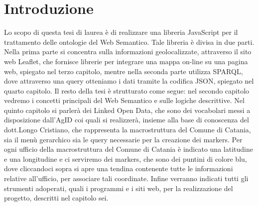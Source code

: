\documentclass[a4paper,11pt]{article}
\begin{document}
\tableofcontents
\newpage

\section{Introduzione}
Lo scopo di questa tesi di laurea è di realizzare una libreria JavaScript per il trattamento delle ontologie del Web Semantico.
Tale libreria è divisa in due parti. Nella prima parte si concentra sulla informazioni geolocalizzate, attraverso il sito web Leaflet, che fornisce librerie per integrare una mappa on-line su una pagina web, spiegato nel terzo capitolo, mentre nella seconda parte utilizza SPARQL, dove attraverso una query otteniamo i dati tramite la codifica JSON, spiegato nel quarto capitolo. 
Il resto della tesi è strutturato come segue: nel secondo capitolo vedremo i concetti principali del Web Semantico e sulle logiche descrittive. Nel quinto capitolo si parlerà  dei Linked Open Data, che sono dei vocabolari messi a disposizione dall'AgID coi quali si realizzerà, insieme alla base di conoscenza del dott.Longo Cristiano, che rappresenta la macrostruttura del Comune di Catania, sia il menù gerarchico sia le query necessarie per la creazione dei markers.
 Per ogni ufficio della macrostruttura del Comune di Catania è indicato una latitudine e una longitudine e ci serviremo dei markers, che sono dei puntini di colore blu, dove cliccandoci sopra si apre una tendina contenente tutte le informazioni relative all'ufficio, per associare tali coordinate. 
Infine verranno indicati tutti gli strumenti adoperati, quali i programmi e i siti web, per la realizzazione del progetto, descritti nel capitolo sei. 



\newpage
\end{document}
